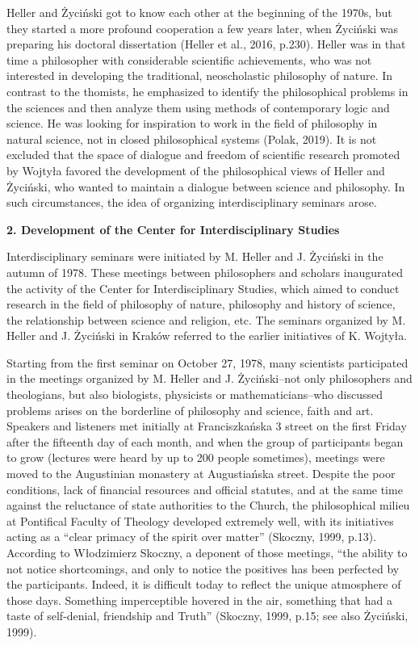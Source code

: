 \documentclass[a4paper]{article}
\begin{document}
Heller and Życiński got to know each other at the beginning of the 1970s, but they started a more profound cooperation a
few years later, when Życiński was preparing his doctoral dissertation \label{ref:RNDBdKmRAvZPP}(Heller et al., 2016,
p.230). Heller was in that time a philosopher with considerable scientific achievements, who was not interested in
developing the traditional, neoscholastic philosophy of nature. In contrast to the thomists, he emphasized to identify
the philosophical problems in the sciences and then analyze them using methods of contemporary logic and science. He
was looking for inspiration to work in the field of philosophy in natural science, not in closed philosophical systems
\label{ref:RND6aWNzFbaUi}(Polak, 2019). It is not excluded that the space of dialogue and freedom of scientific
research promoted by Wojtyła favored the development of the philosophical views of Heller and Życiński, who wanted to
maintain a dialogue between science and philosophy. In such circumstances, the idea of organizing interdisciplinary
seminars arose.

{\bfseries
2. Development of the Center for Interdisciplinary Studies}

Interdisciplinary seminars were initiated by M. Heller and J. Życiński in the autumn of 1978. These meetings between
philosophers and scholars inaugurated the activity of the Center for Interdisciplinary Studies, which aimed to conduct
research in the field of philosophy of nature, philosophy and history of science, the relationship between science and
religion, etc. The seminars organized by M. Heller and J. Życiński in Kraków referred to the earlier initiatives of K.
Wojtyła.

Starting from the first seminar on October 27, 1978, many scientists participated in the meetings organized by M. Heller
and J. Życiński–not only philosophers and theologians, but also biologists, physicists or mathematicians–who discussed
problems arises on the borderline of philosophy and science, faith and art. Speakers and listeners met initially at
Franciszkańska 3 street on the first Friday after the fifteenth day of each month, and when the group of participants
began to grow (lectures were heard by up to 200 people sometimes), meetings were moved to the Augustinian monastery at
Augustiańska street. Despite the poor conditions, lack of financial resources and official statutes, and at the same
time against the reluctance of state authorities to the Church, the philosophical milieu at Pontifical Faculty of
Theology developed extremely well, with its initiatives acting as a “clear primacy of the spirit over matter”
\label{ref:RNDqof40Fu51L}(Skoczny, 1999, p.13). According to Włodzimierz Skoczny, a deponent of those meetings, “the
ability to not notice shortcomings, and only to notice the positives has been perfected by the participants. Indeed, it
is difficult today to reflect the unique atmosphere of those days. Something imperceptible hovered in the air,
something that had a taste of self-denial, friendship and Truth” \label{ref:RNDHDyldo4CpP}(Skoczny, 1999, p.15; see
also Życiński, 1999).
\end{document}
